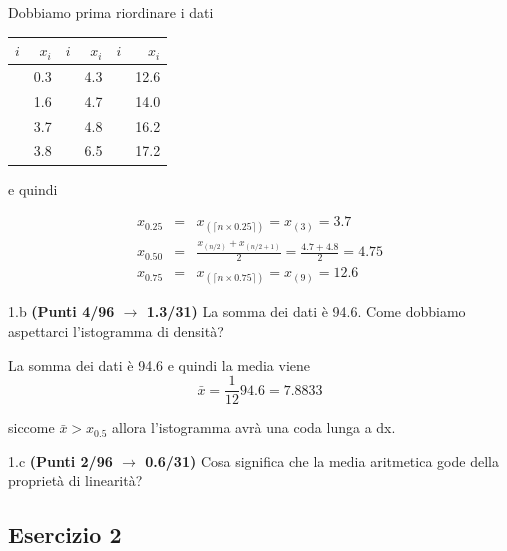 \documentclass[
  11pt,
]{book}
\theoremstyle{mytheoremstyle}
\theoremstyle{mydefstyle}
\newenvironment{sol}
  {
  \begin{tcolorbox}[enhanced,breakable,arc=0.1mm,boxrule=1pt,colback=white,colframe=iblue,
  title=\bf \fontfamily{lmss}\selectfont \hspace{.5 cm} Soluzione,drop fuzzy shadow]

}{
\end{tcolorbox}
  }
\begin{document}
\begin{sol}

Dobbiamo prima riordinare i dati

\begin{table}[H]
\centering
\begin{tabular}{>{\raggedright\arraybackslash}p{3em}r>{\raggedright\arraybackslash}p{3em}r>{\raggedright\arraybackslash}p{3em}r}
\toprule
$i$ & $x_{i}$ & $i$ & $x_{i}$ & $i$ & $x_{i}$\\
\midrule
\cellcolor[HTML]{E6E6E6}{$(1)$} & 0.3 & \cellcolor[HTML]{E6E6E6}{$(5)$} & 4.3 & \cellcolor[HTML]{E6E6E6}{$(9)$} & 12.6\\
\cellcolor[HTML]{E6E6E6}{$(2)$} & 1.6 & \cellcolor[HTML]{E6E6E6}{$(6)$} & 4.7 & \cellcolor[HTML]{E6E6E6}{$(10)$} & 14.0\\
\cellcolor[HTML]{E6E6E6}{$(3)$} & 3.7 & \cellcolor[HTML]{E6E6E6}{$(7)$} & 4.8 & \cellcolor[HTML]{E6E6E6}{$(11)$} & 16.2\\
\cellcolor[HTML]{E6E6E6}{$(4)$} & 3.8 & \cellcolor[HTML]{E6E6E6}{$(8)$} & 6.5 & \cellcolor[HTML]{E6E6E6}{$(12)$} & 17.2\\
\bottomrule
\end{tabular}
\end{table}

e quindi

\begin{eqnarray*}
x_{0.25} &=& x_{(\lceil n\times0.25\rceil)}=x_{(3)}=3.7\\
x_{0.50} &=& \frac{x_{(n/2)}+x_{(n/2+1)}}{2}=\frac{4.7+4.8}{2}
=4.75\\
x_{0.75} &=& x_{(\lceil n\times0.75\rceil)}=x_{(9)}=12.6
\end{eqnarray*}

\end{sol}

1.b \textbf{(Punti 4/96 \(\rightarrow\) 1.3/31)} La somma dei dati è 94.6. Come dobbiamo aspettarci l'istogramma di densità?

\begin{sol}
La somma dei dati è 94.6 e quindi la media viene
\[
\bar x=\frac 1{12}94.6=7.8833
\]

siccome \(\bar x>x_{0.5}\) allora l'istogramma avrà una coda lunga a dx.

\end{sol}

1.c \textbf{(Punti 2/96 \(\rightarrow\) 0.6/31)} Cosa significa che la media aritmetica gode della proprietà di linearità?

\subsection{Esercizio 2}\label{esercizio-2-6}
\end{document}
